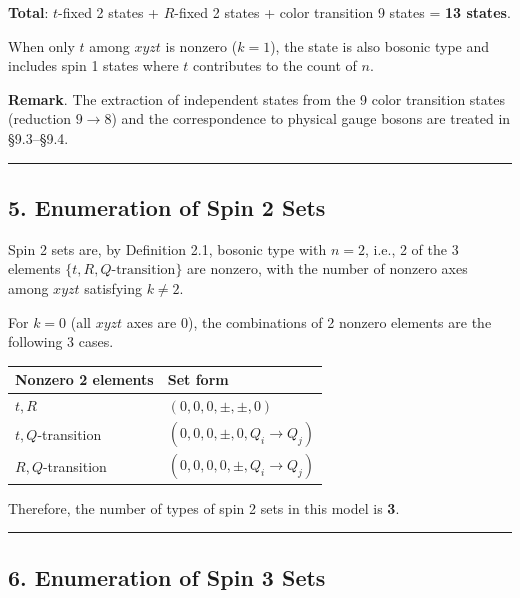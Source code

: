 \documentclass[
  a4paper,11pt]{article}
\newcounter{none}
\theoremstyle{definition}
\theoremstyle{remark}
\begin{document}
\textbf{Total}: \(t\)-fixed 2 states + \(R\)-fixed 2 states + color
transition 9 states = \textbf{13 states}.

When only \(t\) among \(xyzt\) is nonzero (\(k = 1\)), the state is also
bosonic type and includes spin 1 states where \(t\) contributes to the
count of \(n\).

\textbf{Remark}. The extraction of independent states from the 9 color
transition states (reduction \(9 \to 8\)) and the correspondence to
physical gauge bosons are treated in §9.3--§9.4.

\begin{center}\rule{0.5\linewidth}{0.5pt}\end{center}

\subsection{5. Enumeration of Spin 2
Sets}\label{enumeration-of-spin-2-sets}

Spin 2 sets are, by Definition 2.1, bosonic type with \(n = 2\), i.e., 2
of the 3 elements \(\{t, R, Q\text{-transition}\}\) are nonzero, with
the number of nonzero axes among \(xyzt\) satisfying \(k \neq 2\).

For \(k = 0\) (all \(xyzt\) axes are \(0\)), the combinations of 2
nonzero elements are the following 3 cases.

{\def\LTcaptype{none} %
\begin{longtable}[]{@{}ll@{}}
\toprule\noalign{}
Nonzero 2 elements & Set form \\
\midrule\noalign{}
\endhead
\bottomrule\noalign{}
\endlastfoot
\(t, R\) & \((0, 0, 0, \pm, \pm, 0)\) \\
\(t, Q\)-transition & \((0, 0, 0, \pm, 0, Q_i \to Q_j)\) \\
\(R, Q\)-transition & \((0, 0, 0, 0, \pm, Q_i \to Q_j)\) \\
\end{longtable}
}

Therefore, the number of types of spin 2 sets in this model is
\textbf{3}.

\begin{center}\rule{0.5\linewidth}{0.5pt}\end{center}

\subsection{6. Enumeration of Spin 3
Sets}\label{enumeration-of-spin-3-sets}
\end{document}
